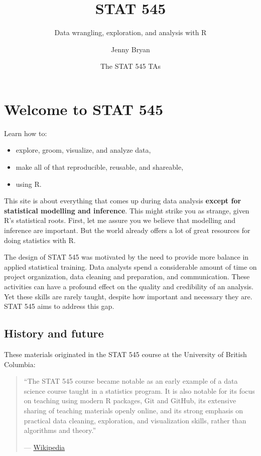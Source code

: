 \documentclass[
]{book}
\title{STAT 545}
\subtitle{Data wrangling, exploration, and analysis with R}
\author{Jenny Bryan \and The STAT 545 TAs}
\date{}
\providecommand{\tightlist}{%
  \setlength{\itemsep}{0pt}\setlength{\parskip}{0pt}}
\begin{document}
\maketitle

{
\setcounter{tocdepth}{1}
\tableofcontents
}
\hypertarget{welcome-to-stat-545}{%
\chapter*{Welcome to STAT 545}\label{welcome-to-stat-545}}

Learn how to:

\begin{itemize}
\tightlist
\item
  explore, groom, visualize, and analyze data,
\item
  make all of that reproducible, reusable, and shareable,
\item
  using R.
\end{itemize}

This site is about everything that comes up during data analysis \textbf{except for statistical modelling and inference}. This might strike you as strange, given R's statistical roots. First, let me assure you we believe that modelling and inference are important. But the world already offers a lot of great resources for doing statistics with R.

The design of STAT 545 was motivated by the need to provide more balance in applied statistical training. Data analysts spend a considerable amount of time on project organization, data cleaning and preparation, and communication. These activities can have a profound effect on the quality and credibility of an analysis. Yet these skills are rarely taught, despite how important and necessary they are. STAT 545 aims to address this gap.

\hypertarget{history-and-future}{%
\section*{History and future}\label{history-and-future}}

These materials originated in the STAT 545 course at the University of British Columbia:

\begin{quote}
``The STAT 545 course became notable as an early example of a data science course taught in a statistics program. It is also notable for its focus on teaching using modern R packages, Git and GitHub, its extensive sharing of teaching materials openly online, and its strong emphasis on practical data cleaning, exploration, and visualization skills, rather than algorithms and theory.''

--- \href{https://en.wikipedia.org/wiki/Jenny_Bryan}{Wikipedia}
\end{quote}
\end{document}
